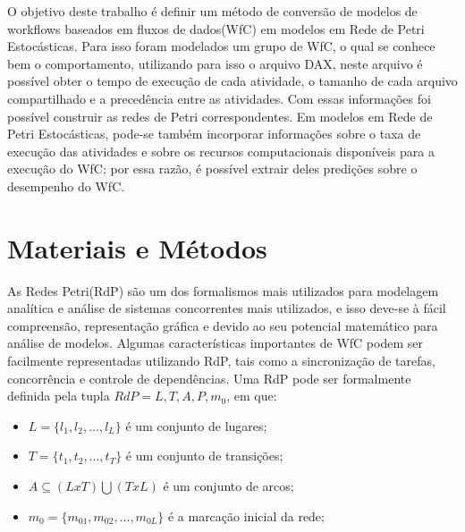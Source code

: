 \documentclass[a4paper,10pt]{article}
\begin{document}


O objetivo deste trabalho é definir um método de conversão de modelos de workflows baseados em fluxos de dados(WfC) em modelos em Rede de Petri Estocásticas. Para isso foram modelados um grupo de WfC, o qual se conhece bem o comportamento, utilizando para isso o arquivo DAX, neste arquivo é possível obter o tempo de execução de cada atividade, o tamanho de cada arquivo compartilhado e a precedência entre as atividades. Com essas informações foi possível construir as redes de Petri correspondentes. Em modelos em Rede de Petri Estocásticas, pode-se também incorporar informações sobre o taxa de execução das atividades e sobre os recursos computacionais disponíveis para a execução do WfC; por essa razão, é possível extrair deles predições sobre o desempenho do WfC.


\section*{Materiais e Métodos}
	
	As Redes Petri(RdP) são um dos formalismos mais utilizados para modelagem analítica e análise de sistemas concorrentes mais utilizados, e isso deve-se à fácil compreensão, representação gráfica e devido ao seu potencial matemático para análise de modelos. Algumas características importantes de WfC podem ser facilmente representadas utilizando RdP, tais como a sincronização de tarefas, concorrência e controle de dependências\cite{Braghetto2011}.
	Uma RdP pode ser formalmente definida pela tupla $RdP={L,T,A,P,m_{0}}$, em que:

		\begin{itemize}
		\item $L=\{l_{1},l_{2},...,l_{L}\}$ é um conjunto de lugares;
		\item $T=\{t_{1},t_{2},...,t_{T}\}$ é um conjunto de transições;
		\item $A\subseteq(L x T)\bigcup (TxL)$ é um conjunto de arcos;
		\item $m_{0}=\{m_{01},m_{02},...,m_{0L}\}$ é a marcação inicial da rede;
		\end{itemize}
\end{document}
